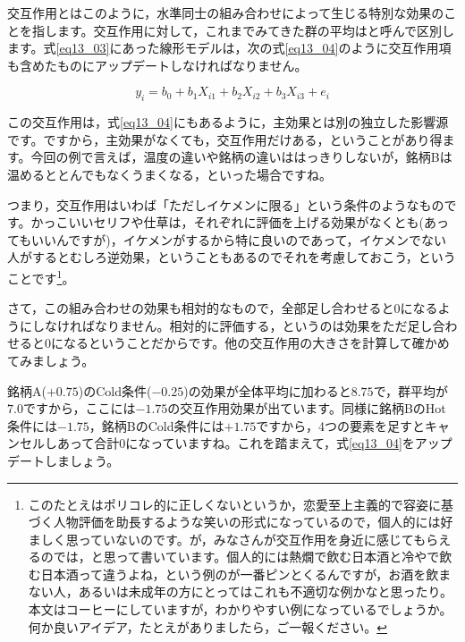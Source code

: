 \documentclass{ltjbook}
\begin{document}
交互作用とはこのように，水準同士の組み合わせによって生じる特別な効果のことを指します。交互作用に対して，これまでみてきた群の平均はと呼んで区別します。式\ref{eq13_03}にあった線形モデルは，次の式\ref{eq13_04}のように交互作用項も含めたものにアップデートしなければなりません。

\begin{equation}
  \label{eq13_04}
y_i = b_0 + b_1 X_{i1}+ b_2 X_{i2} + b_3 X_{i3} + e_{i}
\end{equation}

この交互作用は，式\ref{eq13_04}にもあるように，主効果とは別の独立した影響源です。ですから，主効果がなくても，交互作用だけある，ということがあり得ます。今回の例で言えば，温度の違いや銘柄の違いははっきりしないが，銘柄Bは温めるととんでもなくうまくなる，といった場合ですね。

つまり，交互作用はいわば「ただしイケメンに限る」という条件のようなものです。かっこいいセリフや仕草は，それぞれに評価を上げる効果がなくとも(あってもいいんですが)，イケメンがするから特に良いのであって，イケメンでない人がするとむしろ逆効果，ということもあるのでそれを考慮しておこう，ということです\footnote{このたとえはポリコレ的に正しくないというか，恋愛至上主義的で容姿に基づく人物評価を助長するような笑いの形式になっているので，個人的には好ましく思っていないのです。が，みなさんが交互作用を身近に感じてもらえるのでは，と思って書いています。個人的には熱燗で飲む日本酒と冷やで飲む日本酒って違うよね，という例のが一番ピンとくるんですが，お酒を飲まない人，あるいは未成年の方にとってはこれも不適切な例かなと思ったり。本文はコーヒーにしていますが，わかりやすい例になっているでしょうか。何か良いアイデア，たとえがありましたら，ご一報ください。}。

さて，この組み合わせの効果も相対的なもので，全部足し合わせると$0$になるようにしなければなりません。相対的に評価する，というのは効果をただ足し合わせると$0$になるということだからです。他の交互作用の大きさを計算して確かめてみましょう。

銘柄A($+0.75$)のCold条件($-0.25$)の効果が全体平均に加わると$8.75$で，群平均が$7.0$ですから，ここには$-1.75$の交互作用効果が出ています。同様に銘柄BのHot条件には$-1.75$，銘柄BのCold条件には$+1.75$ですから，4つの要素を足すとキャンセルしあって合計$0$になっていますね。これを踏まえて，式\ref{eq13_04}をアップデートしましょう。
\end{document}
